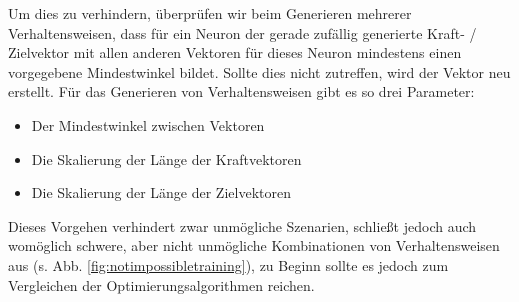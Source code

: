 Um dies zu verhindern, überprüfen wir beim Generieren mehrerer Verhaltensweisen, dass für ein Neuron der gerade zufällig generierte Kraft- / Zielvektor mit allen anderen Vektoren für dieses Neuron mindestens einen vorgegebene Mindestwinkel bildet. 
Sollte dies nicht zutreffen, wird der Vektor neu erstellt.
Für das Generieren von Verhaltensweisen gibt es so drei Parameter:

\begin{itemize}
    \item Der Mindestwinkel zwischen Vektoren
    \item Die Skalierung der Länge der Kraftvektoren
    \item Die Skalierung der Länge der Zielvektoren
\end{itemize}

Dieses Vorgehen verhindert zwar unmögliche Szenarien, schließt jedoch auch womöglich schwere, aber nicht unmögliche Kombinationen von Verhaltensweisen aus (s. Abb. \ref{fig:notimpossibletraining}), 
zu Beginn sollte es jedoch zum Vergleichen der Optimierungsalgorithmen reichen.

